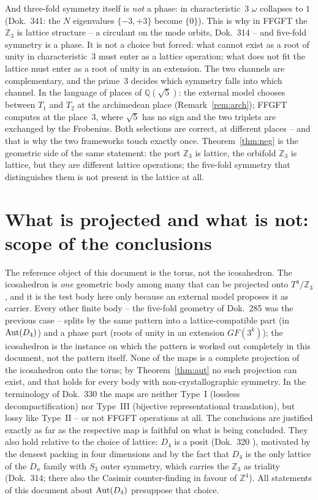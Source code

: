 And three-fold symmetry itself is \emph{not} a phase: in characteristic~3
$\omega$ collapses to $1$ (Dok.~341: the $N$ eigenvalues $\{-3,+3\}$ become
$\{0\}$). This is why in FFGFT the $\mathbb{Z}_3$ is lattice structure --
a circulant on the mode orbits, Dok.~314 -- and five-fold symmetry is a
phase. It is not a choice but forced: what cannot exist as a root of unity
in characteristic~3 must enter as a lattice operation; what does not fit
the lattice must enter as a root of unity in an extension. The two
channels are complementary, and the prime~3 decides which symmetry falls
into which channel. In the language of places of $\mathbb{Q}(\sqrt5)$: the
external model chooses between $T_1$ and $T_2$ at the archimedean place
(Remark~\ref{rem:arch}); FFGFT computes at the place~3, where $\sqrt5$ has
no sign and the two triplets are exchanged by the Frobenius. Both
selections are correct, at different places -- and that is why the two
frameworks touch exactly once. Theorem~\ref{thm:neg} is the geometric side of the
same statement: the port $\mathbb{Z}_3$ is lattice, the orbifold
$\mathbb{Z}_3$ is lattice, but they are different lattice operations; the
five-fold symmetry that distinguishes them is not present in the lattice
at all.

\section{What is projected and what is not: scope of the conclusions}\label{sec:reichweite}

The reference object of this document is the torus, not the icosahedron.
The icosahedron is \emph{one} geometric body among many that can be
projected onto $T^4/\mathbb{Z}_3$, and it is the test body here only
because an external model proposes it as carrier. Every other finite body
-- the five-fold geometry of Dok.~285 was the previous case -- splits by
the same pattern into a lattice-compatible part (in ${\rm Aut}(D_4)$) and
a phase part (roots of unity in an extension $GF(3^k)$); the icosahedron
is the instance on which the pattern is worked out completely in this
document, not the pattern itself. None of the maps is a complete
projection of the icosahedron onto the torus; by Theorem~\ref{thm:aut} no
such projection can exist, and that holds for every body with
non-crystallographic symmetry. In the terminology of Dok.~330 the maps are
neither Type~I (lossless decompactification) nor Type~III (bijective
representational translation), but lossy like Type~II -- or not FFGFT
operations at all. The conclusions are justified exactly as far as the
respective map is faithful on what is being concluded. They also hold
relative to the choice of lattice: $D_4$ is a posit (Dok.~320 \SetzM),
motivated by the densest packing in four dimensions and by the fact that
$D_4$ is the only lattice of the $D_n$ family with $S_3$ outer symmetry,
which carries the $\mathbb{Z}_3$ as triality (Dok.~314; there also the
Casimir counter-finding in favour of $\mathbb{Z}^4$). All statements of
this document about ${\rm Aut}(D_4)$ presuppose that choice.

